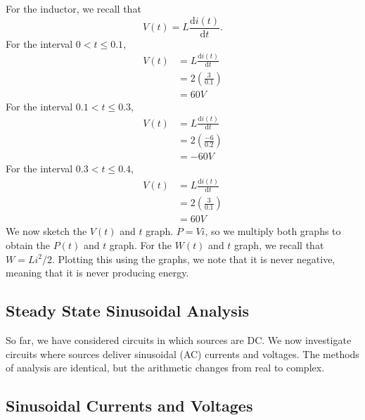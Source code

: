 \documentclass[11pt]{article}
\theoremstyle{plain} %
\theoremstyle{definition}
\theoremstyle{example}
\theoremstyle{remark}
\begin{document}
For the inductor, we recall that 
$$V(t) = L\frac{\mathrm d i(t)}{\mathrm d t}.$$
For the interval $0 < t \leq 0.1$, 
\begin{align*}
	V(t) &= L\frac{\mathrm d i(t)}{\mathrm d t}\\
	&= 2\left(\frac{3}{0.1}\right)\\
	&= 60V
\end{align*}
For the interval $0.1 < t \leq 0.3$, 
\begin{align*}
	V(t) &= L\frac{\mathrm d i(t)}{\mathrm d t}\\
	&= 2\left(\frac{-6}{0.2}\right)\\
	&= -60V
\end{align*}
For the interval $0.3 < t \leq 0.4$, 
\begin{align*}
	V(t) &= L\frac{\mathrm d i(t)}{\mathrm d t}\\
	&= 2\left(\frac{3}{0.1}\right)\\
	&= 60V
\end{align*}
We now sketch the $V(t)$ and $t$ graph. $P = Vi$, so we multiply both graphs to obtain the $P(t)$ and $t$ graph. For the $W(t)$ and $t$ graph, we recall that $W = Li^2/2$. Plotting this using the graphs, we note that it is never negative, meaning that it is never producing energy. 

\subsection{Steady State Sinusoidal Analysis}

So far, we have considered circuits in which sources are DC. We now investigate circuits where sources deliver sinusoidal (AC) currents and voltages. The methods of analysis are identical, but the arithmetic changes from real to complex. 

\subsection{Sinusoidal Currents and Voltages}
\end{document}
